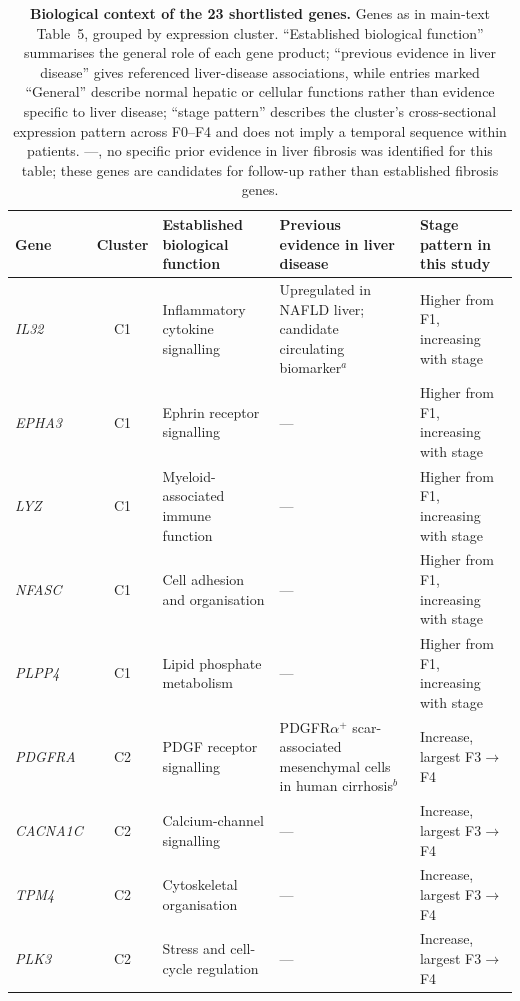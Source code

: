 \documentclass[10pt,a4paper]{article}
\newcommand{\tabsetup}{\sffamily\footnotesize\rowcolors{2}{zebra}{white}\renewcommand{\arraystretch}{1.25}\arrayrulecolor{rule}}
\begin{document}
\begin{table}[p]\centering
\caption{\textbf{Biological context of the 23 shortlisted genes.} Genes as in main-text Table~5, grouped by expression cluster. ``Established biological function'' summarises the general role of each gene product; ``previous evidence in liver disease'' gives referenced liver-disease associations, while entries marked ``General'' describe normal hepatic or cellular functions rather than evidence specific to liver disease; ``stage pattern'' describes the cluster's cross-sectional expression pattern across F0--F4 and does not imply a temporal sequence within patients. ---, no specific prior evidence in liver fibrosis was identified for this table; these genes are candidates for follow-up rather than established fibrosis genes.}
\label{tab:shortlistbio}
{\tabsetup
\begin{tabularx}{\linewidth}{@{}l c >{\raggedright\arraybackslash}X >{\raggedright\arraybackslash}X >{\raggedright\arraybackslash}p{3.6cm}@{}}
\toprule
\rowcolor{white}\textbf{Gene} & \textbf{Cluster} & \textbf{Established biological function} & \textbf{Previous evidence in liver disease} & \textbf{Stage pattern in this study} \\
\midrule
\textit{IL32} & C1 & Inflammatory cytokine signalling & Upregulated in NAFLD liver; candidate circulating biomarker$^{a}$ & Higher from F1, increasing with stage \\
\textit{EPHA3} & C1 & Ephrin receptor signalling & --- & Higher from F1, increasing with stage \\
\textit{LYZ} & C1 & Myeloid-associated immune function & --- & Higher from F1, increasing with stage \\
\textit{NFASC} & C1 & Cell adhesion and organisation & --- & Higher from F1, increasing with stage \\
\textit{PLPP4} & C1 & Lipid phosphate metabolism & --- & Higher from F1, increasing with stage \\
\textit{PDGFRA} & C2 & PDGF receptor signalling & PDGFR$\alpha^{+}$ scar-associated mesenchymal cells in human cirrhosis$^{b}$ & Increase, largest F3$\rightarrow$F4 \\
\textit{CACNA1C} & C2 & Calcium-channel signalling & --- & Increase, largest F3$\rightarrow$F4 \\
\textit{TPM4} & C2 & Cytoskeletal organisation & --- & Increase, largest F3$\rightarrow$F4 \\
\textit{PLK3} & C2 & Stress and cell-cycle regulation & --- & Increase, largest F3$\rightarrow$F4 \\

\end{tabularx}}
\end{table}
\end{document}
